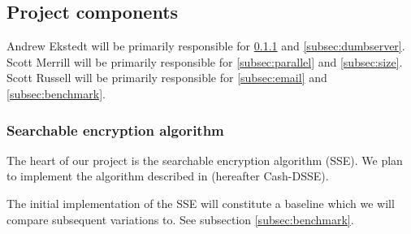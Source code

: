 \subsection{ Project components }





Andrew Ekstedt will be primarily responsible for \ref{subsec:sse} and \ref{subsec:dumbserver}.
Scott Merrill will be primarily responsible for \ref{subsec:parallel} and \ref{subsec:size}.
Scott Russell will be primarily responsible for \ref{subsec:email} and \ref{subsec:benchmark}.

\subsubsection{ Searchable encryption algorithm }
\label{subsec:sse}




The heart of our project is the searchable encryption algorithm (SSE).
We plan to implement the algorithm described in \cite{cash14} (hereafter Cash-DSSE).

The initial implementation of the SSE will constitute a baseline which we will compare subsequent variations to. 
See subsection \ref{subsec:benchmark}.


